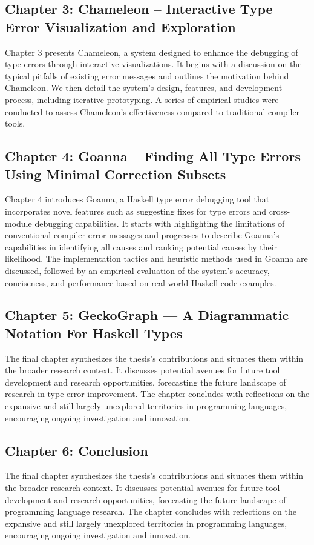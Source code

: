 \subsection{Chapter 3: Chameleon -- Interactive Type Error Visualization and Exploration}
Chapter 3 presents Chameleon, a system designed to enhance the debugging of type errors through interactive visualizations. It begins with a discussion on the typical pitfalls of existing error messages and outlines the motivation behind Chameleon. We then detail the system's design, features, and development process, including iterative prototyping. A series of empirical studies were conducted to assess Chameleon's effectiveness compared to traditional compiler tools.
    
\subsection{Chapter 4: Goanna -- Finding All Type Errors Using Minimal Correction Subsets}
Chapter 4 introduces Goanna, a Haskell type error debugging tool that incorporates novel features such as suggesting fixes for type errors and cross-module debugging capabilities. It starts with highlighting the limitations of conventional compiler error messages and progresses to describe Goanna's capabilities in identifying all causes and ranking potential causes by their likelihood. The implementation tactics and heuristic methods used in Goanna are discussed, followed by an empirical evaluation of the system's accuracy, conciseness, and performance based on real-world Haskell code examples.
    
\subsection{Chapter 5: GeckoGraph — A Diagrammatic Notation For Haskell Types}
The final chapter synthesizes the thesis's contributions and situates them within the broader research context. It discusses potential avenues for future tool development and research opportunities, forecasting the future landscape of research in type error improvement. The chapter concludes with reflections on the expansive and still largely unexplored territories in programming languages, encouraging ongoing investigation and innovation.

    
\subsection{Chapter 6: Conclusion}
The final chapter synthesizes the thesis's contributions and situates them within the broader research context. It discusses potential avenues for future tool development and research opportunities, forecasting the future landscape of programming language research. The chapter concludes with reflections on the expansive and still largely unexplored territories in programming languages, encouraging ongoing investigation and innovation.
